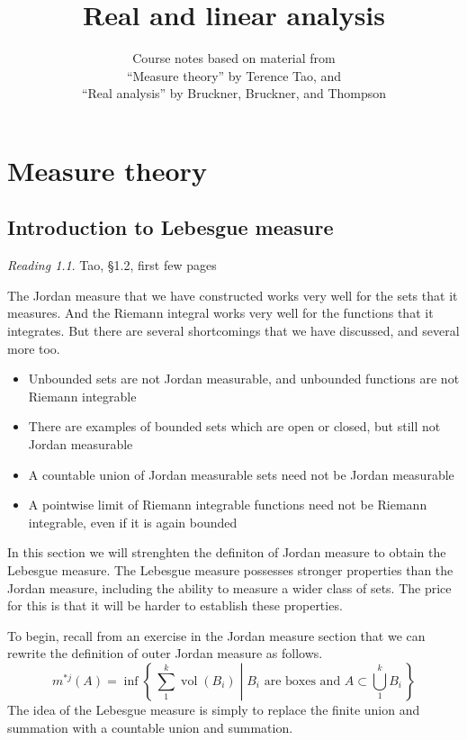 \documentclass[10pt,oneside]{amsbook}
\title{Real and linear analysis}
\author{Course notes based on material from\\``Measure theory'' by Terence Tao, and\\``Real analysis'' by Bruckner, Bruckner, and Thompson}
\newcommand{\set}[1]{\left\{\,#1\,\right\}}
\DeclareMathOperator{\vol}{vol}
\theoremstyle{definition}
\theoremstyle{plain}
\theoremstyle{definition}
\theoremstyle{remark}
\newtheorem*{reading}{Reading}
\numberwithin{equation}{section}
\numberwithin{figure}{section}
\begin{document}

\tableofcontents
\newpage

\chapter{Measure theory}
% 


\section{Introduction to Lebesgue measure}

\begin{reading}
  Tao, \S1.2, first few pages
\end{reading}

The Jordan measure that we have constructed works very well for the sets that it measures. And the Riemann integral works very well for the functions that it integrates. But there are several shortcomings that we have discussed, and several more too.
\begin{itemize}
\item Unbounded sets are not Jordan measurable, and unbounded functions are not Riemann integrable
\item There are examples of bounded sets which are open or closed, but still not Jordan measurable
\item A countable union of Jordan measurable sets need not be Jordan measurable
\item A pointwise limit of Riemann integrable functions need not be Riemann integrable, even if it is again bounded
\end{itemize}

In this section we will strenghten the definiton of Jordan measure to obtain the Lebesgue measure. The Lebesgue measure possesses stronger properties than the Jordan measure, including the ability to measure a wider class of sets. The price for this is that it will be harder to establish these properties.

To begin, recall from an exercise in the Jordan measure section that we can rewrite the definition of outer Jordan measure as follows.
\[m^{*j}(A)=\inf\set{\left.\sum_1^k \vol(B_i)\;\right|\;\text{$B_i$ are boxes and }A\subset\bigcup_1^kB_i}
\]
The idea of the Lebesgue measure is simply to replace the finite union and summation with a countable union and summation.
\end{document}
